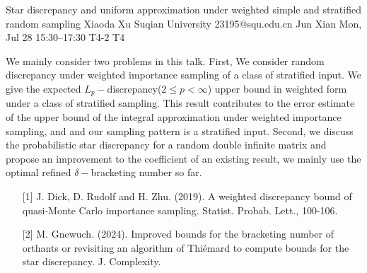 \begin{talk}
  {Star discrepancy and uniform approximation under weighted simple and stratified random sampling}%
  {Xiaoda Xu}%
  {Suqian University}%
  {23195@squ.edu.cn}%
  {Jun Xian}%
  {}%
  {Mon, Jul 28 15:30–17:30}%
  {T4-2}%
  {T4}%
  
				
			
We mainly consider two problems in this talk. First, We consider random discrepancy under weighted importance sampling of a class of stratified input. We give the expected $L_p-$discrepancy($2\leq p<\infty$) upper bound in weighted form under a class of stratified sampling. This result contributes to the error estimate of the upper bound of the integral approximation under weighted importance sampling, and and our sampling pattern is a stratified input. Second, we discuss the probabilistic star discrepancy for a random double infinite matrix and propose an improvement to the coefficient of an existing result, we mainly use the optimal refined $\delta-$bracketing number so far.
\medskip


\begin{enumerate}
	\item[{[1]}] J. Dick, D. Rudolf and H. Zhu. (2019). A weighted discrepancy bound of quasi-Monte Carlo importance sampling. Statist. Probab. Lett., 100-106.
	\item[{[2]}] M. Gnewuch. (2024). Improved bounds for the bracketing number of orthants or revisiting an algorithm of Thiémard to compute bounds for the star discrepancy. J. Complexity.
\end{enumerate}


\end{talk}

